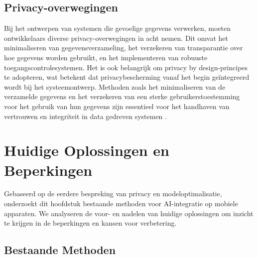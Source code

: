 \subsection{Privacy-overwegingen}

Bij het ontwerpen van systemen die gevoelige gegevens verwerken, moeten ontwikkelaars diverse privacy-overwegingen in acht nemen. Dit omvat het minimaliseren van gegevensverzameling, het verzekeren van transparantie over hoe gegevens worden gebruikt, en het implementeren van robuuste toegangscontrolesystemen. Het is ook belangrijk om privacy by design-principes te adopteren, wat betekent dat privacybescherming vanaf het begin geïntegreerd wordt bij het systeemontwerp. Methoden zoals het minimaliseren van de verzamelde gegevens en het verzekeren van een sterke gebruikerstoestemming voor het gebruik van hun gegevens zijn essentieel voor het handhaven van vertrouwen en integriteit in data gedreven systemen \autocite{Edwards2019}.


\section{Huidige Oplossingen en Beperkingen}

Gebaseerd op de eerdere bespreking van privacy en modeloptimalisatie, onderzoekt dit hoofdstuk bestaande methoden voor AI-integratie op mobiele apparaten. We analyseren de voor- en nadelen van huidige oplossingen om inzicht te krijgen in de beperkingen en kansen voor verbetering.

\subsection{Bestaande Methoden}

